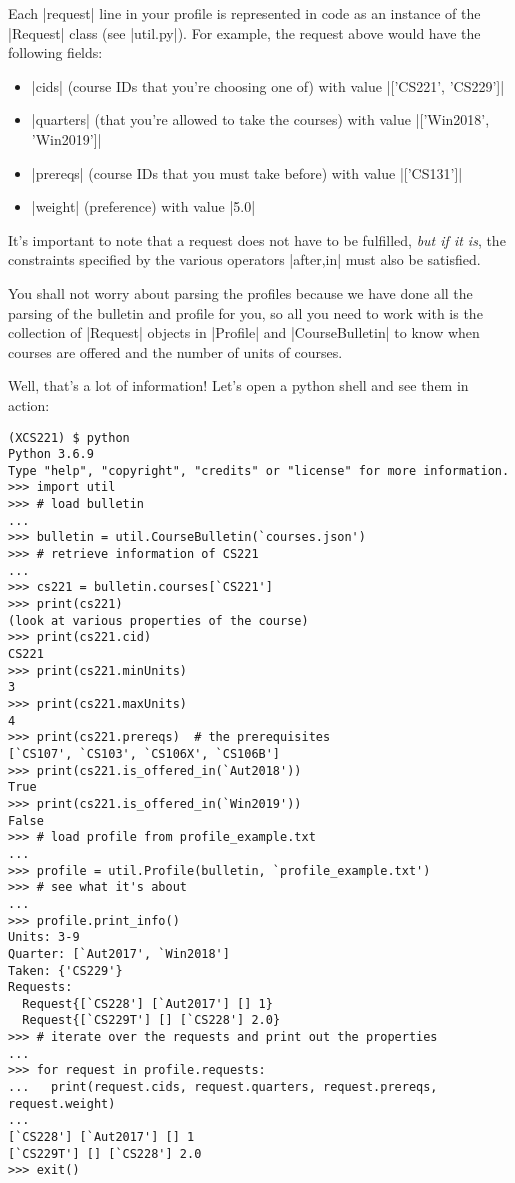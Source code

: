 Each |request| line in your profile is represented in code as an instance of the
|Request| class (see |util.py|). For example, the request above would have the
following fields:
\begin{itemize}
    \item |cids| (course IDs that you're choosing one of) with value
    |['CS221', 'CS229']|
    \item |quarters| (that you're allowed to take the courses) with value |['Win2018', 'Win2019']|
    \item |prereqs| (course IDs that you must take before) with value |['CS131']|
    \item |weight| (preference) with value |5.0|
\end{itemize}

It's important to note that a request does not have to be fulfilled,
{\em but if it is}, the constraints specified by the various operators
|after,in| must also be satisfied.

You shall not worry about parsing the profiles because we have done all the
parsing of the bulletin and profile for you, so all you need to work with is the
collection of |Request| objects in |Profile| and |CourseBulletin| to know when
courses are offered and the number of units of courses.

Well, that's a lot of information! Let's open a python shell and see them in
action:
\begin{lstlisting}
(XCS221) $ python
Python 3.6.9
Type "help", "copyright", "credits" or "license" for more information.
>>> import util
>>> # load bulletin
...
>>> bulletin = util.CourseBulletin(`courses.json')
>>> # retrieve information of CS221
...
>>> cs221 = bulletin.courses[`CS221']
>>> print(cs221)
(look at various properties of the course)
>>> print(cs221.cid)
CS221
>>> print(cs221.minUnits)
3
>>> print(cs221.maxUnits)
4
>>> print(cs221.prereqs)  # the prerequisites
[`CS107', `CS103', `CS106X', `CS106B']
>>> print(cs221.is_offered_in(`Aut2018'))
True
>>> print(cs221.is_offered_in(`Win2019'))
False
>>> # load profile from profile_example.txt
...
>>> profile = util.Profile(bulletin, `profile_example.txt')
>>> # see what it's about
...
>>> profile.print_info()
Units: 3-9
Quarter: [`Aut2017', `Win2018']
Taken: {'CS229'}
Requests:
  Request{[`CS228'] [`Aut2017'] [] 1}
  Request{[`CS229T'] [] [`CS228'] 2.0}
>>> # iterate over the requests and print out the properties
...
>>> for request in profile.requests:
...   print(request.cids, request.quarters, request.prereqs, request.weight)
...
[`CS228'] [`Aut2017'] [] 1
[`CS229T'] [] [`CS228'] 2.0
>>> exit()
\end{lstlisting}

